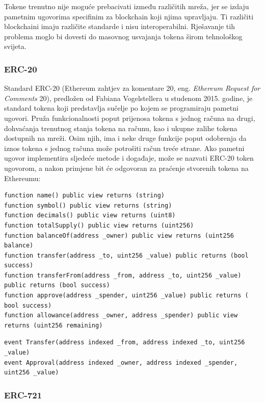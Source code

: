 \documentclass[times, utf8, diplomski]{fer}
\begin{document}
Tokene trenutno nije moguće prebacivati između različitih mreža, jer se izdaju pametnim ugovorima specifinim za blockchain koji njima upravljaju. Ti različiti blockchaini imaju različite standarde i nisu interoperabilni. Rješavanje tih problema moglo bi dovesti do masovnog usvajanja tokena širom tehnološkog svijeta.
\subsubsection{ERC-20}

Standard ERC-20 (Ethereum zahtjev za komentare 20,  eng.  \textit{Ethereum Request for Comments} 20), predložen od  Fabiana Vogelstellera u studenom 2015. godine, je standard tokena koji predstavlja sučelje po kojem se programiraju pametni ugovori. Pruža funkcionalnosti poput prijenosa tokena s jednog računa na drugi, dohvaćanja trenutnog stanja tokena na računu, kao i ukupne zalihe tokena dostupnih na mreži. Osim njih, ima i neke druge funkcije poput odobrenja da iznos tokena s jednog računa može potrošiti račun treće strane. Ako pametni ugovor implementira sljedeće metode i događaje, može se nazvati ERC-20 token ugovorom, a nakon primjene bit će odgovoran za praćenje stvorenih
tokena na Ethereumu:

\begin{lstlisting}
function name() public view returns (string)
function symbol() public view returns (string)
function decimals() public view returns (uint8)
function totalSupply() public view returns (uint256)
function balanceOf(address _owner) public view returns (uint256 balance)
function transfer(address _to, uint256 _value) public returns (bool success)
function transferFrom(address _from, address _to, uint256 _value) public returns (bool success)
function approve(address _spender, uint256 _value) public returns ( bool success)
function allowance(address _owner, address _spender) public view returns (uint256 remaining)
\end{lstlisting}
\begin{lstlisting}
event Transfer(address indexed _from, address indexed _to, uint256 _value)
event Approval(address indexed _owner, address indexed _spender,  uint256 _value)
\end{lstlisting}

\subsubsection{ERC-721}
\end{document}
